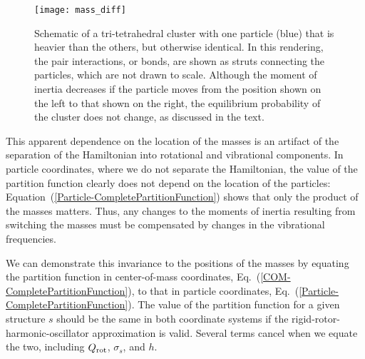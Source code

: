 \documentclass[pre, aps, twocolumn, reprint, amsmath,amssymb, showpacs,
superscriptaddress] {revtex4-1}
\begin{document}
\begin{figure}
	\begin{centering}
    \texttt{[image: mass\_diff]}
    \caption{Schematic of a tri-tetrahedral cluster with one particle
      (blue) that is heavier than the others, but otherwise identical.
      In this rendering, the pair interactions, or bonds, are shown as
      struts connecting the particles, which are not drawn to scale.
      Although the moment of inertia decreases if the particle moves
      from the position shown on the left to that shown on the right,
      the equilibrium probability of the cluster does not change, as
      discussed in the text.}
    \label{fig:Mass_Difference}
	\end{centering}
\end{figure}

This apparent dependence on the location of the masses is an artifact of
the separation of the Hamiltonian into rotational and vibrational
components. In particle coordinates, where we do not separate the
Hamiltonian, the value of the partition function clearly does not depend
on the location of the particles:
Equation~(\ref{Particle-CompletePartitionFunction}) shows that only the
product of the masses matters. Thus, any changes to the moments of
inertia resulting from switching the masses must be compensated by
changes in the vibrational frequencies.

We can demonstrate this invariance to the positions of the masses by
equating the partition function in center-of-mass coordinates,
Eq.~(\ref{COM-CompletePartitionFunction}), to that in particle
coordinates, Eq.~(\ref{Particle-CompletePartitionFunction}). The value
of the partition function for a given structure $s$ should be the same
in both coordinate systems if the rigid-rotor-harmonic-oscillator
approximation is valid. Several terms cancel when we equate the two,
including $Q_\textnormal{rot}$, $\sigma_s$, and $h$.
\end{document}
